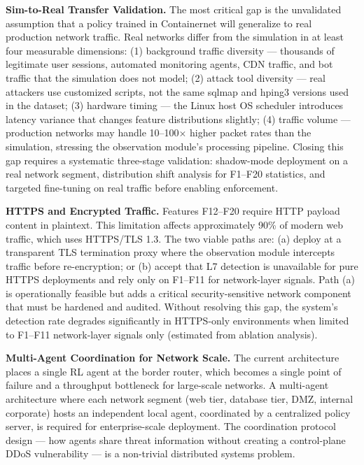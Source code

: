 \documentclass[12pt,a4paper]{report}
\begin{document}
\textbf{Sim-to-Real Transfer Validation.} The most critical gap is the unvalidated assumption that a policy trained in Containernet will generalize to real production network traffic. Real networks differ from the simulation in at least four measurable dimensions: (1) background traffic diversity --- thousands of legitimate user sessions, automated monitoring agents, CDN traffic, and bot traffic that the simulation does not model; (2) attack tool diversity --- real attackers use customized scripts, not the same sqlmap and hping3 versions used in the dataset; (3) hardware timing --- the Linux host OS scheduler introduces latency variance that changes feature distributions slightly; (4) traffic volume --- production networks may handle 10--100$\times$ higher packet rates than the simulation, stressing the observation module's processing pipeline. Closing this gap requires a systematic three-stage validation: shadow-mode deployment on a real network segment, distribution shift analysis for F1--F20 statistics, and targeted fine-tuning on real traffic before enabling enforcement.

\textbf{HTTPS and Encrypted Traffic.} Features F12--F20 require HTTP payload content in plaintext. This limitation affects approximately 90\% of modern web traffic, which uses HTTPS/TLS 1.3. The two viable paths are: (a) deploy at a transparent TLS termination proxy where the observation module intercepts traffic before re-encryption; or (b) accept that L7 detection is unavailable for pure HTTPS deployments and rely only on F1--F11 for network-layer signals. Path (a) is operationally feasible but adds a critical security-sensitive network component that must be hardened and audited. Without resolving this gap, the system's detection rate degrades significantly in HTTPS-only environments when limited to F1--F11 network-layer signals only (estimated from ablation analysis).

\textbf{Multi-Agent Coordination for Network Scale.} The current architecture places a single RL agent at the border router, which becomes a single point of failure and a throughput bottleneck for large-scale networks. A multi-agent architecture where each network segment (web tier, database tier, DMZ, internal corporate) hosts an independent local agent, coordinated by a centralized policy server, is required for enterprise-scale deployment. The coordination protocol design --- how agents share threat information without creating a control-plane DDoS vulnerability --- is a non-trivial distributed systems problem.
\end{document}
